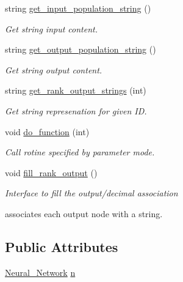 \begin{DoxyCompactItemize}
string \hyperlink{a00001_a13d1128905d7b4a3bdec2e40392cd036}{get\-\_\-input\-\_\-population\-\_\-string} ()
\begin{DoxyCompactList}\small\item\em Get string input content. \end{DoxyCompactList}\item 
string \hyperlink{a00001_a368e05b24358cc70bd8b7d2081cd0dd4}{get\-\_\-output\-\_\-population\-\_\-string} ()
\begin{DoxyCompactList}\small\item\em Get string output content. \end{DoxyCompactList}\item 
string \hyperlink{a00001_acd21da57c513a63893641ac505c097f0}{get\-\_\-rank\-\_\-output\-\_\-strings} (int)
\begin{DoxyCompactList}\small\item\em Get string represenation for given I\-D. \end{DoxyCompactList}\item 
void \hyperlink{a00001_abcb9cd1427a3b6ecfd41432391ec9bdc}{do\-\_\-function} (int)
\begin{DoxyCompactList}\small\item\em Call rotine specified by parameter mode. \end{DoxyCompactList}\item 
void \hyperlink{a00001_a44a6161fabb28c07ba6e860ba9927aa6}{fill\-\_\-rank\-\_\-output} ()
\begin{DoxyCompactList}\small\item\em Interface to fill the output/decimal association\par
 associates each output node with a string. \end{DoxyCompactList}\end{DoxyCompactItemize}
\subsection*{Public Attributes}
\begin{DoxyCompactItemize}
\item 
\hyperlink{a00003}{Neural\-\_\-\-Network} \hyperlink{a00001_ac70ea2427e95618bb3903b2c57ee9745}{n}
\end{DoxyCompactItemize}
